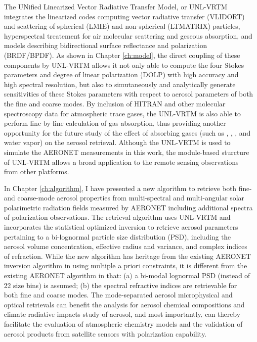 The UNified Linearized Vector Radiative Transfer Model, or UNL-VRTM integrates
the linearized codes computing vector radiative transfer (VLIDORT) and
scattering of spherical (LMIE) and non-spherical (LTMATRIX) particles, 
hyperspectral treatement for air molecular scattering and geseous absorption,
and models describing bidirectional surface reflectance and polarization
(BRDF/BPDF). As shown in Chapter \ref{ch:model}, the direct coupling of these
components by UNL-VRTM allows it not only able to compute the four Stokes
parameters and degree of linear polarization (DOLP) with high accuracy and high
spectral resolution, but also to simutaneously and analytically generate
sensitivities of these Stokes parameters with respect to aerosol parameters of
both the fine and coarse modes. By inclusion of HITRAN and other molecular
spectroscopy data for atmospheric trace gases, the UNL-VRTM is also able to
perform line-by-line calculation of gas absorption, thus providing another
opportunity for the future study of the effect of absorbing gases (such as
, , , and water vapor) on the aerosol retrieval. 
Although the UNL-VRTM is used to simulate the AERONET measurements in
this work, the module-based sturcture of UNL-VRTM allows a broad application
to the remote sensing observations from other platforms.

In Chapter \ref{ch:algorithm}, I have presented a new algorithm to 
retrieve both fine- and coarse-mode aerosol properties from multi-spectral 
and multi-angular solar polarimetric radiation fields measured by AERONET 
including additional spectra of polarization observations. 
The retrieval algorithm uses UNL-VRTM and incorporates the
statistical optimized inversion to retrieve aerosol parameters pertaining to a
bi-lognormal particle size distribution (PSD), including the aerosol volume
concentration, effective radius and variance, and complex indices of
refraction. While the new algorithm has heritage from the existing AERONET
inversion algorithm in using multiple a priori constraints, it is different
from the existing AERONET algorithm in that: (a) a bi-modal lognormal PSD
(instead of 22 size bins) is assumed; (b) the spectral refractive indices are
retrievable for both fine and coarse modes. The mode-separated aerosol
microphysical and optical retrievals can benefit the analysis for aerosol
chemical compositions and climate radiative impacts study of aerosol, 
and most importantly, can thereby facilitate the evaluation of
atmospheric chemistry models and the validation of aerosol products from
satellite sensors with polarization capability.  

